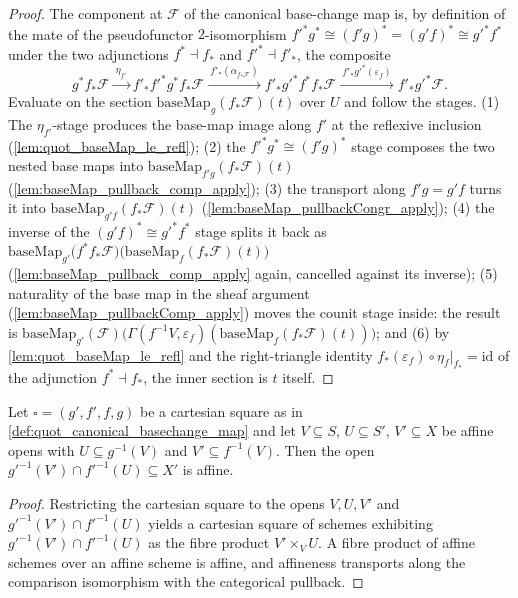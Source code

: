 \begin{proof}\leanok
  The component at \(\mathcal F\) of the canonical base-change map is, by
  definition of the mate of the pseudofunctor \(2\)-isomorphism
  \(f'^* g^* \cong (f' g)^* = (g' f)^* \cong g'^* f^*\) under the two
  adjunctions \(f^* \dashv f_*\) and \(f'^* \dashv f'_*\), the composite
  \[
    g^* f_* \mathcal F
    \xrightarrow{\ \eta_{f'}\ }
    f'_* f'^* g^* f_* \mathcal F
    \xrightarrow{\ f'_*(\alpha_{f_*\mathcal F})\ }
    f'_* g'^* f^* f_* \mathcal F
    \xrightarrow{\ f'_* g'^*(\varepsilon_f)\ }
    f'_* g'^* \mathcal F .
  \]
  Evaluate on the section \(\mathrm{baseMap}_g(f_*\mathcal F)(t)\) over
  \(U\) and follow the stages. (1) The \(\eta_{f'}\)-stage produces the
  base-map image along \(f'\) at the reflexive inclusion
  (\cref{lem:quot_baseMap_le_refl}); (2) the
  \(f'^* g^* \cong (f' g)^*\) stage composes the two nested base maps into
  \(\mathrm{baseMap}_{f' g}(f_*\mathcal F)(t)\)
  (\cref{lem:baseMap_pullback_comp_apply}); (3) the transport along
  \(f' g = g' f\) turns it into
  \(\mathrm{baseMap}_{g' f}(f_*\mathcal F)(t)\)
  (\cref{lem:baseMap_pullbackCongr_apply}); (4) the inverse of the
  \((g' f)^* \cong g'^* f^*\) stage splits it back as
  \(\mathrm{baseMap}_{g'}\bigl(f^* f_* \mathcal F\bigr)
    \bigl(\mathrm{baseMap}_{f}(f_*\mathcal F)(t)\bigr)\)
  (\cref{lem:baseMap_pullback_comp_apply} again, cancelled against its
  inverse); (5) naturality of the base map in the sheaf argument
  (\cref{lem:baseMap_pullbackComp_apply}) moves the counit stage inside:
  the result is
  \(\mathrm{baseMap}_{g'}(\mathcal F)\bigl(
     \Gamma(f^{-1}V, \varepsilon_f)(\mathrm{baseMap}_{f}(f_*\mathcal F)(t))
   \bigr)\);
  and (6) by \cref{lem:quot_baseMap_le_refl} and the right-triangle
  identity \(f_*(\varepsilon_f) \circ \eta_{f}|_{f_*} = \mathrm{id}\) of the
  adjunction \(f^* \dashv f_*\), the inner section is \(t\) itself.
\end{proof}

\begin{lemma}
  \label{lem:quot_isAffineOpen_preimage_inf}
  \leanok
  Let \(\square = (g', f', f, g)\) be a cartesian square as in
  \cref{def:quot_canonical_basechange_map} and let \(V \subseteq S\),
  \(U \subseteq S'\), \(V' \subseteq X\) be affine opens with
  \(U \subseteq g^{-1}(V)\) and \(V' \subseteq f^{-1}(V)\). Then the open
  \(g'^{-1}(V') \cap f'^{-1}(U) \subseteq X'\) is affine.
\end{lemma}
\begin{proof}\leanok
  Restricting the cartesian square to the opens \(V, U, V'\) and
  \(g'^{-1}(V') \cap f'^{-1}(U)\) yields a cartesian square of schemes
  exhibiting \(g'^{-1}(V') \cap f'^{-1}(U)\) as the fibre product
  \(V' \times_V U\). A fibre product of affine schemes over an affine
  scheme is affine, and affineness transports along the comparison
  isomorphism with the categorical pullback.
\end{proof}

